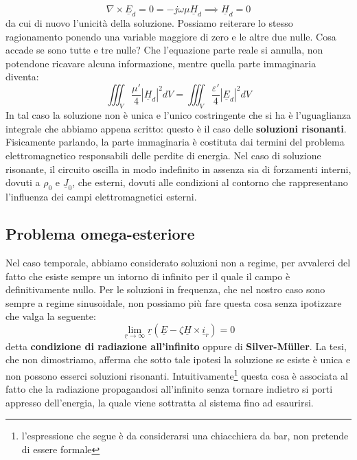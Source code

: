 \documentclass{book}
\begin{document}
\begin{equation}
    \nabla \times \underline{E}_{d} = 0 = -j \omega \mu \underline{H}_{d} \implies \underline{H}_{d}=0
\end{equation}
da cui di nuovo l'unicità della soluzione. Possiamo reiterare lo stesso ragionamento ponendo una variable maggiore di zero e le altre due nulle. Cosa accade se sono tutte e tre nulle? Che l'equazione parte reale si annulla, non potendone ricavare alcuna informazione, mentre quella parte immaginaria diventa:
\begin{equation}
    \iiint_{V} \frac{\mu'}{4}|\underline{H}_{d}|^{2}dV = \iiint_{V} \frac{\varepsilon'}{4}|\underline{E}_{d}|^{2}dV
\end{equation}
In tal caso la soluzione non è unica e l'unico costringente che si ha è l'uguaglianza integrale che abbiamo appena scritto: questo è il caso delle \textbf{soluzioni risonanti}. Fisicamente parlando, la parte immaginaria è costituta dai termini del problema elettromagnetico responsabili delle perdite di energia. Nel caso di soluzione risonante, il circuito oscilla in modo indefinito in assenza sia di forzamenti interni, dovuti a $\rho_{0}$ e $\underline{J}_{0}$, che esterni, dovuti alle condizioni al contorno che rappresentano l'influenza dei campi elettromagnetici esterni.
\subsection{Problema omega-esteriore}
    Nel caso temporale, abbiamo considerato soluzioni non a regime, per avvalerci del fatto che esiste sempre un intorno di infinito per il quale il campo è definitivamente nullo. Per le soluzioni in frequenza, che nel nostro caso sono sempre a regime sinusoidale, non possiamo più fare questa cosa senza ipotizzare che valga la seguente:
    \begin{equation}
        \lim_{\underline{r} \to \infty} \underline{r}(\underline{E}-\zeta \underline{H} \times \underline{i}_{r}) = 0
    \end{equation}
    detta \textbf{condizione di radiazione all'infinito} oppure di \textbf{Silver-M{\"u}ller}. La tesi, che non dimostriamo, afferma che sotto tale ipotesi la soluzione se esiste è unica e non possono esserci soluzioni risonanti. Intuitivamente\footnote{l'espressione che segue è da considerarsi una chiacchiera da bar, non pretende di essere formale} questa cosa è associata al fatto che la radiazione propagandosi all'infinito senza tornare indietro si porti appresso dell'energia, la quale viene sottratta al sistema fino ad esaurirsi.
\end{document}
